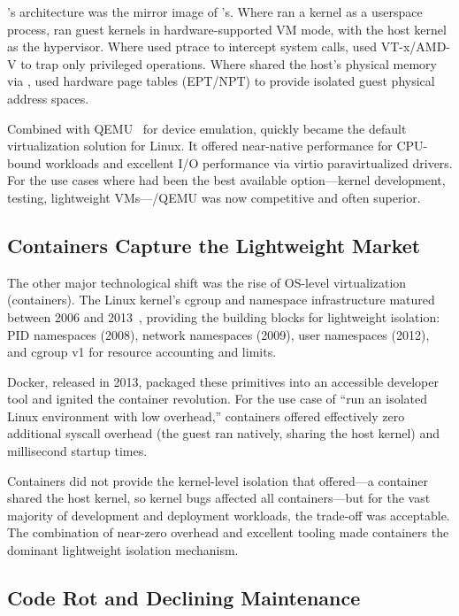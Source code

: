 \KVM{}'s architecture was the mirror image of \UML{}'s.  Where \UML{} ran a
kernel as a userspace process, \KVM{} ran guest kernels in hardware-supported
VM mode, with the host kernel as the hypervisor.  Where \UML{} used ptrace
to intercept system calls, \KVM{} used VT-x/AMD-V to trap only privileged
operations.  Where \UML{} shared the host's physical memory via ,
\KVM{} used hardware page tables (EPT/NPT) to provide isolated guest physical
address spaces.

Combined with QEMU~\cite{bellard2005} for device emulation, \KVM{} quickly
became the default virtualization solution for Linux.  It offered near-native
performance for CPU-bound workloads and excellent I/O performance via virtio
paravirtualized drivers.  For the use cases where \UML{} had been the best
available option---kernel development, testing, lightweight VMs---\KVM{}/QEMU
was now competitive and often superior.

\subsection{Containers Capture the Lightweight Market}
\label{sec:history-containers}

The other major technological shift was the rise of OS-level virtualization
(containers).  The Linux kernel's cgroup and namespace infrastructure matured
between 2006 and 2013~\cite{soltesz2007,namespaces}, providing the building
blocks for lightweight isolation: PID namespaces (2008), network namespaces
(2009), user namespaces (2012), and cgroup v1 for resource accounting and
limits.

Docker, released in 2013, packaged these primitives into an accessible
developer tool and ignited the container revolution.  For the use case of
``run an isolated Linux environment with low overhead,'' containers offered
effectively zero additional syscall overhead (the guest ran natively, sharing
the host kernel) and millisecond startup times.

Containers did not provide the kernel-level isolation that \UML{} offered---a
container shared the host kernel, so kernel bugs affected all containers---but
for the vast majority of development and deployment workloads, the trade-off
was acceptable.  The combination of near-zero overhead and excellent tooling
made containers the dominant lightweight isolation mechanism.

\subsection{Code Rot and Declining Maintenance}
\label{sec:history-rot}

